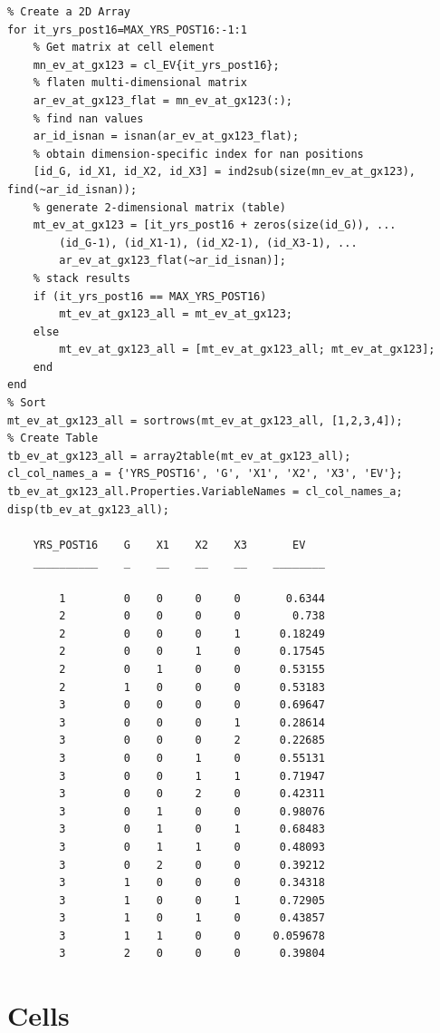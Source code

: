\documentclass[
]{book}
\begin{document}
\begin{verbatim}
% Create a 2D Array
for it_yrs_post16=MAX_YRS_POST16:-1:1
    % Get matrix at cell element
    mn_ev_at_gx123 = cl_EV{it_yrs_post16};
    % flaten multi-dimensional matrix
    ar_ev_at_gx123_flat = mn_ev_at_gx123(:);
    % find nan values
    ar_id_isnan = isnan(ar_ev_at_gx123_flat);
    % obtain dimension-specific index for nan positions
    [id_G, id_X1, id_X2, id_X3] = ind2sub(size(mn_ev_at_gx123), find(~ar_id_isnan));
    % generate 2-dimensional matrix (table)
    mt_ev_at_gx123 = [it_yrs_post16 + zeros(size(id_G)), ...
        (id_G-1), (id_X1-1), (id_X2-1), (id_X3-1), ...
        ar_ev_at_gx123_flat(~ar_id_isnan)];
    % stack results
    if (it_yrs_post16 == MAX_YRS_POST16)
        mt_ev_at_gx123_all = mt_ev_at_gx123;
    else
        mt_ev_at_gx123_all = [mt_ev_at_gx123_all; mt_ev_at_gx123];
    end
end
% Sort
mt_ev_at_gx123_all = sortrows(mt_ev_at_gx123_all, [1,2,3,4]);
% Create Table
tb_ev_at_gx123_all = array2table(mt_ev_at_gx123_all);
cl_col_names_a = {'YRS_POST16', 'G', 'X1', 'X2', 'X3', 'EV'};
tb_ev_at_gx123_all.Properties.VariableNames = cl_col_names_a;
disp(tb_ev_at_gx123_all);

    YRS_POST16    G    X1    X2    X3       EV   
    __________    _    __    __    __    ________

        1         0    0     0     0       0.6344
        2         0    0     0     0        0.738
        2         0    0     0     1      0.18249
        2         0    0     1     0      0.17545
        2         0    1     0     0      0.53155
        2         1    0     0     0      0.53183
        3         0    0     0     0      0.69647
        3         0    0     0     1      0.28614
        3         0    0     0     2      0.22685
        3         0    0     1     0      0.55131
        3         0    0     1     1      0.71947
        3         0    0     2     0      0.42311
        3         0    1     0     0      0.98076
        3         0    1     0     1      0.68483
        3         0    1     1     0      0.48093
        3         0    2     0     0      0.39212
        3         1    0     0     0      0.34318
        3         1    0     0     1      0.72905
        3         1    0     1     0      0.43857
        3         1    1     0     0     0.059678
        3         2    0     0     0      0.39804
\end{verbatim}

\hypertarget{cells}{%
\section{Cells}\label{cells}}
\end{document}
